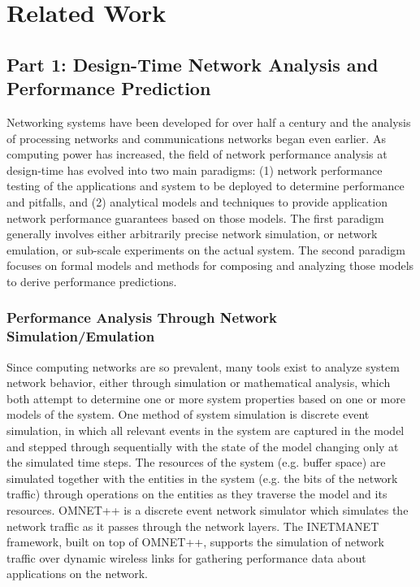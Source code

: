 \chapter{Related Work}
\label{ch:background}

\section{Part 1: Design-Time Network Analysis and Performance Prediction}
\label{sec:related_part1}

Networking systems have been developed for over half a century and the
analysis of processing networks and communications networks began even
earlier.  As computing power has increased, the field of network
performance analysis at design-time has evolved into two main
paradigms: (1) network performance testing of the applications and
system to be deployed to determine performance and pitfalls, and (2)
analytical models and techniques to provide application network
performance guarantees based on those models.  The first paradigm
generally involves either arbitrarily precise network simulation, or
network emulation, or sub-scale experiments on the actual system.  The
second paradigm focuses on formal models and methods for composing and
analyzing those models to derive performance predictions.

\subsection{Performance Analysis Through Network Simulation/Emulation}
\label{subsec:related_part1_simulation_emulation}

Since computing networks are so prevalent, many tools exist to analyze
system network behavior, either through simulation or mathematical
analysis, which both attempt to determine one or more system
properties based on one or more models of the system.  One method of
system simulation is discrete event
simulation\cite{devs_Schriber2013}, in which all relevant events in
the system are captured in the model and stepped through sequentially
with the state of the model changing only at the simulated time steps.
The resources of the system (e.g. buffer space) are simulated together
with the entities in the system (e.g. the bits of the network traffic)
through operations on the entities as they traverse the model and its
resources.  OMNET++\cite{omnet++} is a discrete event network
simulator which simulates the network traffic as it passes through the
network layers.  The INETMANET\cite{vagas2010inetmanet} framework,
built on top of OMNET++, supports the simulation of network traffic
over dynamic wireless links for gathering performance data about
applications on the network.

